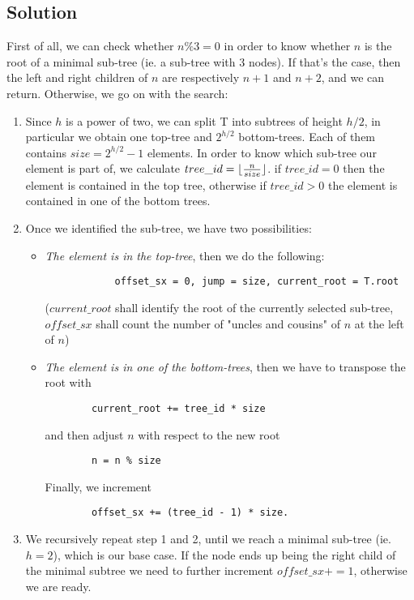 \documentclass[a4paper]{article}
\DeclarePairedDelimiter\floor{\lfloor}{\rfloor}
\begin{document}
\subsection*{Solution}
First of all, we can check whether $n\%3 = 0$ in order to know whether $n$ is the root of a minimal sub-tree (ie. a sub-tree with 3 nodes). If that's the case, then the left and right children of $n$ are respectively $n+1$ and $n+2$, and we can return. Otherwise, we go on with the search:\\
\begin{enumerate}
 \item Since $h$ is a power of two, we can split T into subtrees of height $h/2$, in particular we obtain one top-tree and $2^{h/2}$ bottom-trees. Each of them contains $size = 2^{h/2}-1$ elements. In order to know which sub-tree our element is part of, we calculate $tree\_id = \floor{\frac{n}{size}}$. if $tree\_id = 0$ then the element is contained in the top tree, otherwise if $tree\_id > 0$ the element is contained in one of the bottom trees.
\item Once we identified the sub-tree, we have two possibilities:
	\begin{itemize}
	\item \emph{The element is in the top-tree}, then we do the following:\\
		\begin{verbatim}
			offset_sx = 0, jump = size, current_root = T.root
		\end{verbatim}
		($current\_root$ shall identify the root of the currently selected sub-tree, $offset\_sx$ shall count the number of "uncles and cousins"  of $n$ at the left of $n$)
	\item \emph{The element is in one of the bottom-trees}, then we have to transpose the root with 
	\begin{verbatim}
		current_root += tree_id * size
	\end{verbatim}
	and then adjust $n$ with respect to the new root 
\begin{verbatim}
		n = n % size
	\end{verbatim}
 Finally, we increment  
\begin{verbatim}
		offset_sx += (tree_id - 1) * size.
\end{verbatim}
	\end{itemize}
\item We recursively repeat step 1 and 2, until we reach a minimal sub-tree (ie. $h=2$), which is our base case. If the node ends up being the right child of the minimal subtree we need to further increment $offset\_sx += 1$, otherwise we are ready.


\end{enumerate}
\end{document}
